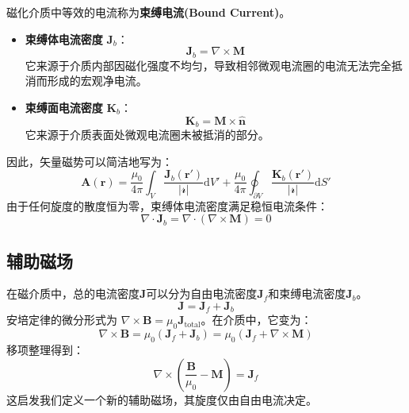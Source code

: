 \documentclass[fontset=none]{ctexart}
\begin{document}
\begin{definition}[束缚电流]
    磁化介质中等效的电流称为\textbf{束缚电流(Bound Current)}。
    \begin{itemize}
        \item \textbf{束缚体电流密度} $\bm{J}_b$：
        \begin{equation}
            \bm{J}_b = \nabla \times \bm{M}
        \end{equation}
        它来源于介质内部因磁化强度不均匀，导致相邻微观电流圈的电流无法完全抵消而形成的宏观净电流。
        \item \textbf{束缚面电流密度} $\bm{K}_b$：
        \begin{equation}
            \bm{K}_b = \bm{M} \times \hat{\bm{n}}
        \end{equation}
        它来源于介质表面处微观电流圈未被抵消的部分。
    \end{itemize}
\end{definition}
因此，矢量磁势可以简洁地写为：
\begin{equation}
    \bm{A}(\bm{r}) = \frac{\mu_0}{4\pi} \int_V \frac{\bm{J}_b(\bm{r}')}
    {|\bm{\mathscr{r}}|} \mathrm{d}V' + \frac{\mu_0}{4\pi} \oint_{\partial V} 
    \frac{\bm{K}_b(\bm{r}')}{|\bm{\mathscr{r}}|} \mathrm{d}S'
\end{equation}
由于任何旋度的散度恒为零，束缚体电流密度满足稳恒电流条件：
\begin{equation}
    \nabla \cdot \bm{J}_b = \nabla \cdot (\nabla \times \bm{M}) = 0
\end{equation}

\subsection{辅助磁场}
在磁介质中，总的电流密度$\bm{J}$可以分为自由电流密度$\bm{J}_f$和束缚电流密度$\bm{J}_b$。
\begin{equation}
    \bm{J} = \bm{J}_f + \bm{J}_b
\end{equation}
安培定律的微分形式为 $\nabla \times \bm{B} = \mu_0 \bm{J}_{\text{total}}$。在介质中，它变为：
\begin{equation}
    \nabla \times \bm{B} = \mu_0 (\bm{J}_f + \bm{J}_b) = \mu_0 (\bm{J}_f + \nabla \times \bm{M})
\end{equation}
移项整理得到：
\begin{equation}
    \nabla \times \left( \frac{\bm{B}}{\mu_0} - \bm{M} \right) = \bm{J}_f
\end{equation}
这启发我们定义一个新的辅助磁场，其旋度仅由自由电流决定。
\end{document}
